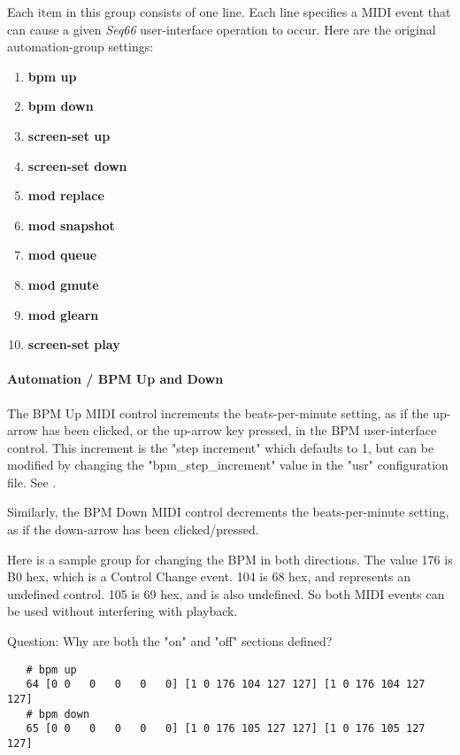    Each item in this group consists of one line.  Each line
   specifies a MIDI event that can cause a given
   \textsl{Seq66} user-interface operation to occur.
   Here are the original automation-group settings:

   \begin{enumerate}
      \item \textbf{bpm up}
      \item \textbf{bpm down}
      \item \textbf{screen-set up}
      \item \textbf{screen-set down}
      \item \textbf{mod replace}
      \item \textbf{mod snapshot}
      \item \textbf{mod queue}
      \item \textbf{mod gmute}
      \item \textbf{mod glearn}
      \item \textbf{screen-set play}
   \end{enumerate}

\paragraph{Automation / BPM Up and Down}
\label{paragraph:seq66_rc_file_midi_ctrl_bpmupdn}

   The BPM Up MIDI control increments the beats-per-minute setting, as if
   the up-arrow has been clicked, or the up-arrow key pressed, in
   the BPM user-interface control.
   This increment is the
   "step increment" which defaults to 1, but can be modified by
   changing the "bpm\_step\_increment" value in the "usr"
   configuration file.
   See .

   Similarly, the BPM Down MIDI control decrements the beats-per-minute
   setting, as if the down-arrow has been clicked/pressed.

   Here is a sample group for changing the BPM in both directions.  The value
   176 is B0 hex, which is a Control Change event.  104 is 68 hex, and
   represents an undefined control.  105 is 69 hex, and is also undefined. So
   both MIDI events can be used without interfering with playback.

   Question: Why are both the "on" and "off" sections defined?

   \begin{verbatim}
   # bpm up
   64 [0 0   0   0   0   0] [1 0 176 104 127 127] [1 0 176 104 127 127]
   # bpm down
   65 [0 0   0   0   0   0] [1 0 176 105 127 127] [1 0 176 105 127 127]
   \end{verbatim}


